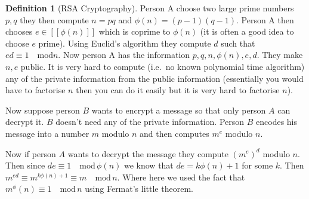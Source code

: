 \documentclass[
]{book}
\theoremstyle{definition}
\newtheorem{definition}{Definition}[chapter]
\theoremstyle{definition}
\theoremstyle{definition}
\theoremstyle{definition}
\theoremstyle{remark}
\begin{document}
\begin{definition}[RSA Cryptography]
Person A choose two large prime numbers \(p,q\) they then compute \(n=pq\) and \(\phi(n) = (p-1)(q-1)\). Person A then chooses \(e \in [[\phi(n)]]\) which is coprime to \(\phi(n)\) (it is often a good idea to choose \(e\) prime). Using Euclid's algorithm they compute \(d\) such that \(ed \equiv 1 \quad \mbox{mod} n\). Now person A has the information \(p,q,n,\phi(n),e,d\). They make \(n,e\) public. It is very hard to compute (i.e.~no known polynomial time algorithm) any of the private information from the public information (essentially you would have to factorise \(n\) then you can do it easily but it is very hard to factorise \(n\)).

Now suppose person \(B\) wants to encrypt a message so that only person \(A\) can decrypt it. \(B\) doesn't need any of the private information. Person \(B\) encodes his message into a number \(m\) modulo \(n\) and then computes \(m^e\) modulo \(n\).

Now if person \(A\) wants to decrypt the message they compute \((m^e)^d\) modulo \(n\). Then since \(de \equiv 1 \quad \mbox{mod}\, \phi(n)\) we know that \(de = k\phi(n)+1\) for some \(k\). Then \(m^{ed} \equiv m^{k\phi(n)+1} \equiv m \quad \mbox{mod} \, n\). Where here we used the fact that \(m^\phi(n) \equiv 1 \quad \mbox{mod} \, n\) using Fermat's little theorem.
\end{definition}

  
\end{document}

